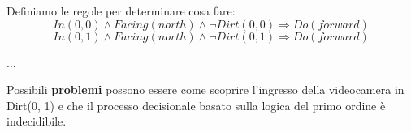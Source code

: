 Definiamo le regole per determinare cosa fare:
\begin{displaymath}
    In(0, 0) \land Facing(north) \land \lnot Dirt(0, 0) \Rightarrow Do(forward)
\end{displaymath}
\begin{displaymath}
    In(0, 1) \land Facing(north) \land \lnot Dirt(0, 1) \Rightarrow Do(forward)
\end{displaymath}
\begin{center}
    ...
\end{center}

Possibili \textbf{problemi} possono essere come scoprire l'ingresso della videocamera in Dirt(0, 1) e che il processo decisionale basato sulla logica del primo ordine è indecidibile.